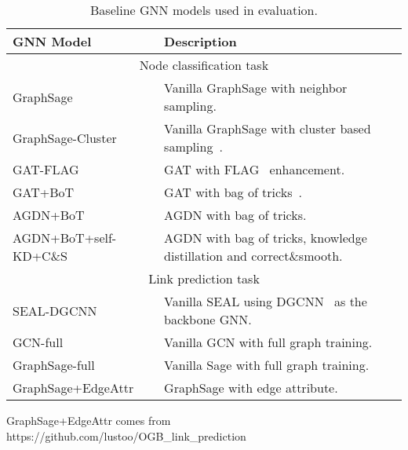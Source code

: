 \begin{table*}
\centering
\begin{threeparttable}
 \caption{Baseline GNN models used in evaluation.}
\label{tab:models}
\begin{tabular}{ll}
 \toprule 
 GNN Model & Description \\
 \midrule
 \multicolumn{2}{c}{Node classification task} \\
 \midrule
GraphSage & Vanilla GraphSage with neighbor sampling. \\
GraphSage-Cluster & Vanilla GraphSage with cluster based sampling~\cite{chiang2019cluster}. \\
GAT-FLAG & GAT with FLAG~\cite{kong2020flag} enhancement. \\
GAT+BoT & GAT with bag of tricks~\cite{wang2021bag}. \\
AGDN+BoT & AGDN with bag of tricks. \\
AGDN+BoT+self-KD+C\&S & AGDN with bag of tricks, knowledge distillation and correct\&smooth\cite{huang2020combining}. \\
 \midrule
\multicolumn{2}{c}{Link prediction task} \\
 \midrule
SEAL-DGCNN & Vanilla SEAL using DGCNN~\cite{zhang2018end} as the backbone GNN.\\
GCN-full & Vanilla GCN with full graph training. \\
GraphSage-full & Vanilla Sage with full graph training. \\
GraphSage+EdgeAttr & GraphSage with edge attribute.\\
\bottomrule
\end{tabular}
\begin{tablenotes}
\scriptsize
\small
  \item GraphSage+EdgeAttr comes from https://github.com/lustoo/OGB\_link\_prediction 
\end{tablenotes}
\end{threeparttable}
\end{table*}


